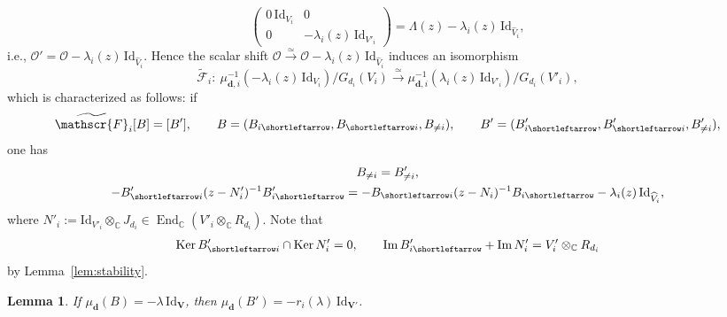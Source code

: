 \documentclass[pdftex]{sigma}
\newcommand{\slar}{\shortleftarrow}
\numberwithin{equation}{section}
\newtheorem{Lemma}[Theorem]{Lemma}
\theoremstyle{definition}
\newcommand{\lemref}[1]{Lemma~\ref{#1}}
\newcommand{\C}{\mathbb{C}} %
\newcommand{\End}{\operatorname{End}}
\newcommand{\Ker}{\operatorname{Ker}}
\newcommand{\range}{\operatorname{Im}}
\newcommand{\unit}{\mathrm{Id}}
\newcommand{\bV}{\mathbf{V}}
\newcommand{\ved}{\mathbf{d}}
\newcommand{\bO}{\mathcal{O}}
\newcommand{\frF}{\mathscr{F}} %
\begin{document}
\[
\begin{pmatrix} 0\,\unit_{V_i} & 0 \\
0 & -\lambda_i(z)\,\unit_{V'_i} \end{pmatrix}
=\Lambda(z)-\lambda_i(z)\,\unit_{\widehat{V}_i},
\]
i.e., $\bO' = \bO - \lambda_i(z)\,\unit_{\widehat{V}_i}$.
Hence the scalar shift
$\bO \xrightarrow{\simeq} \bO - \lambda_i(z)\,\unit_{\widehat{V}_i}$
induces an isomorphism
\[
\widetilde{\frF}_i \colon \
\mu_{\ved,i}^{-1}(-\lambda_i(z)\,\unit_{V_i})/G_{d_i}(V_i) \xrightarrow{\simeq}
\mu_{\ved,i}^{-1}(\lambda_i(z)\,\unit_{V'_i})/G_{d_i}(V'_i),
\]
which is characterized as follows: if
\[
\widetilde{\frF}_i[B]=[B'], \qquad
B=(B_{i \slar},B_{\slar i},B_{\neq i}),\qquad
B' =(B'_{i \slar},B'_{\slar i},B_{\neq i}'),
\]
one has
\begin{gather}
B_{\neq i}  = B_{\neq i}', \label{eq:refrelother}\\
- B'_{\slar i}(z-N'_i)^{-1}B'_{i \slar}
 =- B_{\slar i}(z-N_i)^{-1}B_{i \slar} - \lambda_i(z)\,\unit_{\widehat{V}_i},
\label{eq:shift}
\end{gather}
where $N'_i := \unit_{V'_i} \otimes_\C J_{d_i}
\in \End_\C(V'_i \otimes_\C R_{d_i})$.
Note that
\begin{gather}\label{eq:refstability}
\Ker B'_{\slar i} \cap \Ker N'_i =0, \qquad
\range B'_{i \slar} + \range N'_i = V'_i \otimes_\C R_{d_i}
\end{gather}
by \lemref{lem:stability}.

\begin{Lemma}\label{lem:refmoment}
If $\mu_\ved(B)=-\lambda\,\unit_\bV$,
then $\mu_{\ved}(B')=-r_i(\lambda)\,\unit_{\bV'}$.
\end{Lemma}
\end{document}
